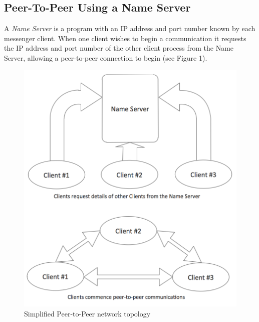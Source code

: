 \documentclass[a4paper, 12pt]{article}
\begin{document}
\subsection{Peer-To-Peer Using a Name Server}
A \emph{Name Server} is a program with an IP address and port number known
by each messenger client. When one client wishes to begin a communication it
requests the IP address and port number of the other client process from the
Name Server, allowing a peer-to-peer connection to begin (see Figure 1).\\
\begin{center}
\begin{figure}[ht]
\centering
\includegraphics[scale=0.75]{p2p_topology}
\caption{Simplified Peer-to-Peer network topology}
\end{figure}
\end{center}
\end{document}
